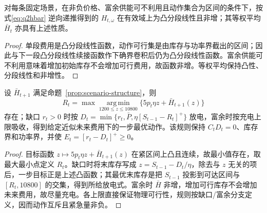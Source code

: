 \begin{proposition}[场景未来费用函数的结构保持]\label{prop:scenario-structure}
对每条固定场景，在非负价格、富余供能可不利用且动作集合为区间的条件下，按式\eqref{eq:q2hbar} 逆向递推得到的 $H_{t,\omega}$ 在有效域上为凸分段线性且非增；其等权平均 $\bar H_t$ 亦具有上述性质。\end{proposition}

\begin{proof}
单段费用是凸分段线性函数，动作可行集是由库存与功率界截出的区间；因此与下一段凸分段线性续接函数作下确界卷积后仍为凸分段线性函数。富余供能可不利用意味着增加初始库存不会增加可行费用，故函数非增。等权平均保持凸性、分段线性和非增性。
\end{proof}

\begin{proposition}[动态保留阈值执行]\label{prop:reserve-execution}
设 $\bar H_{t+1}$ 满足命题~\ref{prop:scenario-structure}，则
\[
R_t=\max\operatorname*{arg\,min}_{1200\le z\le10800}\{5p_t\eta z+\bar H_{t+1}(z)\}
\]
存在；缺口 $r_t>0$ 时按 $D_t=\min\{r_t,\bar P,\eta[S_{t-1}-R_t]^+\}$ 放电，富余时按充电上限吸收，得到给定近似未来费用下的一步最优动作。该规则保持 $C_tD_t=0$、库存界和功率界，并使 $E_t=[r_t-D_t]^+\ge0$。
\end{proposition}

\begin{proof}
目标函数 $z\mapsto5p_t\eta z+\bar H_{t+1}(z)$ 在紧区间上凸且连续，故最小值存在，取最大最小点定义 $R_t$。缺口时将末库存写成 $z=S_{t-1}-D_t/\eta$，除去与 $z$ 无关的项后，一步目标正是上述凸函数；其最优末库存是把 $S_{t-1}$ 投影到可达区间与 $[R_t,10800]$ 的交集，得到所给放电式。富余时 $\bar H$ 非增，增加可行库存不会增加未来费用，故尽量充电。各上限直接保证物理可行性，规则按缺口/富余分支定义，因而动作互斥且紧急量非负。
\end{proof}
